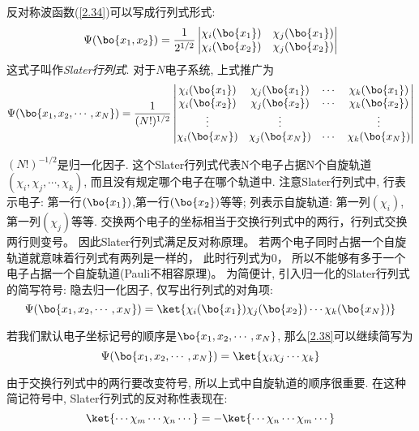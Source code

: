反对称波函数(\autoref{2.34})可以写成行列式形式:
\begin{equation}
\Psi(\bo{x_1,x_2})=\frac{1}{2^{1/2}}
\begin{vmatrix}
\chi_i(\bo{x_1})&\chi_j(\bo{x_1})\\
\chi_i(\bo{x_2})&\chi_j(\bo{x_2})
\end{vmatrix}
\end{equation}
这式子叫作\emph{Slater行列式}.
对于$N$电子系统, 
上式推广为
\begin{equation}
\Psi(\bo{x_1,x_2,\cdots,x_N})=\frac{1}{(N!)^{1/2}}
\begin{vmatrix}
\chi_i(\bo{x_1})&\chi_j(\bo{x_1})&\cdots&\chi_k(\bo{x_1})\\
\chi_i(\bo{x_2})&\chi_j(\bo{x_2})&\cdots&\chi_k(\bo{x_2})\\
\vdots			&\vdots			& \,&\vdots\\
\chi_i(\bo{x_N})&\chi_j(\bo{x_N})&\cdots&\chi_k(\bo{x_N})
\end{vmatrix}
\end{equation}

$(N!)^{-1/2}$是归一化因子. 
这个Slater行列式代表N个电子占据N个自旋轨道$(\chi_i,\chi_j,\cdots,\chi_k)$, 
而且没有规定哪个电子在哪个轨道中. 
注意Slater行列式中, 行表示电子: 第一行$(\bo{x_1})$,第一行$(\bo{x_2})$等等; 
列表示自旋轨道: 第一列$(\chi_i)$,第一列$(\chi_j)$等等. 
交换两个电子的坐标相当于交换行列式中的两行，行列式交换两行则变号。
因此Slater行列式满足反对称原理。
若两个电子同时占据一个自旋轨道就意味着行列式有两列是一样的，
此时行列式为$0$，
所以不能够有多于一个电子占据一个自旋轨道(Pauli不相容原理)。
为简便计, 引入归一化的Slater行列式的简写符号: 隐去归一化因子, 仅写出行列式的对角项:
\begin{equation}
\label{2.38}
\Psi(\bo{x_1,x_2,\cdots,x_N})=\ket{\chi_i(\bo{x_1})\chi_j(\bo{x_2})\cdots\chi_k(\bo{x_N})}
\end{equation}

若我们默认电子坐标记号的顺序是$\bo{x_1,x_2,\cdots,x_N}$, 
那么\autoref{2.38}可以继续简写为
\begin{equation}
\Psi(\bo{x_1,x_2,\cdots,x_N})=\ket{\chi_i\chi_j\cdots\chi_k}
\end{equation}

由于交换行列式中的两行要改变符号, 
所以上式中自旋轨道的顺序很重要. 
在这种简记符号中, 
Slater行列式的反对称性表现在:
\begin{equation}\label{2.40}
\ket{\cdots\chi_m\cdots\chi_n\cdots}=-\ket{\cdots\chi_n\cdots\chi_m\cdots}
\end{equation}

